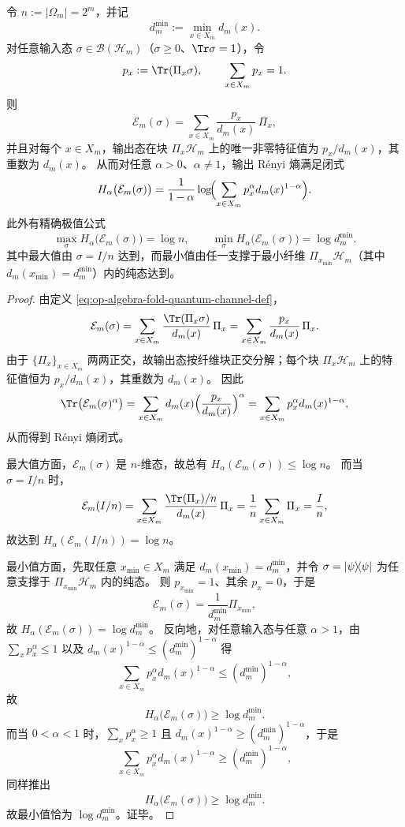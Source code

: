 \begin{theorem}\label{thm:op-algebra-fold-quantum-channel-output-renyi-entropy-range}
令 \(n:=|\Omega_m|=2^m\)，并记
\[
d_m^{\min}:=\min_{x\in X_m}d_m(x).
\]
对任意输入态 \(\sigma\in\mathcal{B}(\mathcal{H}_m)\)（\(\sigma\ge 0\)、\(\Tr\sigma=1\)），令
\[
p_x:=\Tr(\Pi_x\sigma),
\qquad
\sum_{x\in X_m}p_x=1.
\]
则
\[
\mathcal{E}_m(\sigma)=\sum_{x\in X_m}\frac{p_x}{d_m(x)}\,\Pi_x,
\]
并且对每个 \(x\in X_m\)，输出态在块 \(\Pi_x\mathcal{H}_m\) 上的唯一非零特征值为 \(p_x/d_m(x)\)，其重数为 \(d_m(x)\)。
从而对任意 \(\alpha>0\)、\(\alpha\neq 1\)，输出 Rényi 熵满足闭式
\[
H_\alpha\bigl(\mathcal{E}_m(\sigma)\bigr)
=
\frac{1}{1-\alpha}\log\!\Bigl(
\sum_{x\in X_m} p_x^\alpha d_m(x)^{1-\alpha}
\Bigr).
\]
此外有精确极值公式
\[
\max_{\sigma}H_\alpha\bigl(\mathcal{E}_m(\sigma)\bigr)=\log n,
\qquad
\min_{\sigma}H_\alpha\bigl(\mathcal{E}_m(\sigma)\bigr)=\log d_m^{\min}.
\]
其中最大值由 \(\sigma=I/n\) 达到，而最小值由任一支撑于最小纤维 \(\Pi_{x_{\min}}\mathcal{H}_m\)（其中 \(d_m(x_{\min})=d_m^{\min}\)）内的纯态达到。
\end{theorem}
\begin{proof}
由定义 \eqref{eq:op-algebra-fold-quantum-channel-def}，
\[
\mathcal{E}_m(\sigma)=\sum_{x\in X_m}\frac{\Tr(\Pi_x\sigma)}{d_m(x)}\,\Pi_x
=
\sum_{x\in X_m}\frac{p_x}{d_m(x)}\,\Pi_x.
\]
由于 \(\{\Pi_x\}_{x\in X_m}\) 两两正交，故输出态按纤维块正交分解；每个块 \(\Pi_x\mathcal{H}_m\) 上的特征值恒为 \(p_x/d_m(x)\)，其重数为 \(d_m(x)\)。
因此
\[
\Tr\bigl(\mathcal{E}_m(\sigma)^\alpha\bigr)
=
\sum_{x\in X_m}d_m(x)\Bigl(\frac{p_x}{d_m(x)}\Bigr)^\alpha
=
\sum_{x\in X_m}p_x^\alpha d_m(x)^{1-\alpha},
\]
从而得到 Rényi 熵闭式。

最大值方面，\(\mathcal{E}_m(\sigma)\) 是 \(n\)-维态，故总有
\(
H_\alpha(\mathcal{E}_m(\sigma))\le \log n
\)。
而当 \(\sigma=I/n\) 时，
\[
\mathcal{E}_m(I/n)
=
\sum_{x\in X_m}\frac{\Tr(\Pi_x)/n}{d_m(x)}\,\Pi_x
=
\frac{1}{n}\sum_{x\in X_m}\Pi_x
=
\frac{I}{n},
\]
故达到
\(
H_\alpha(\mathcal{E}_m(I/n))=\log n
\)。

最小值方面，先取任意 \(x_{\min}\in X_m\) 满足 \(d_m(x_{\min})=d_m^{\min}\)，并令 \(\sigma=\lvert \psi\rangle\!\langle \psi\rvert\) 为任意支撑于 \(\Pi_{x_{\min}}\mathcal{H}_m\) 内的纯态。
则 \(p_{x_{\min}}=1\)、其余 \(p_x=0\)，于是
\[
\mathcal{E}_m(\sigma)=\frac{1}{d_m^{\min}}\Pi_{x_{\min}},
\]
故
\(
H_\alpha(\mathcal{E}_m(\sigma))=\log d_m^{\min}
\)。
反向地，对任意输入态与任意 \(\alpha>1\)，由 \(\sum_x p_x^\alpha\le 1\) 以及 \(d_m(x)^{1-\alpha}\le (d_m^{\min})^{1-\alpha}\) 得
\[
\sum_{x\in X_m}p_x^\alpha d_m(x)^{1-\alpha}\le (d_m^{\min})^{1-\alpha},
\]
故
\[
H_\alpha\bigl(\mathcal{E}_m(\sigma)\bigr)\ge \log d_m^{\min}.
\]
而当 \(0<\alpha<1\) 时，\(\sum_x p_x^\alpha\ge 1\) 且 \(d_m(x)^{1-\alpha}\ge (d_m^{\min})^{1-\alpha}\)，于是
\[
\sum_{x\in X_m}p_x^\alpha d_m(x)^{1-\alpha}\ge (d_m^{\min})^{1-\alpha},
\]
同样推出
\[
H_\alpha\bigl(\mathcal{E}_m(\sigma)\bigr)\ge \log d_m^{\min}.
\]
故最小值恰为 \(\log d_m^{\min}\)。证毕。
\end{proof}


